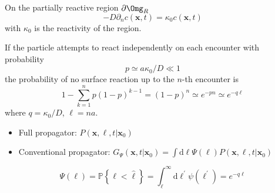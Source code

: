 \documentclass[9pt]{beamer}
\newcommand{\mrm}{\mathrm}
\newcommand{\llc}{\left\{}
\newcommand{\rrc}{\right\}}
\newcommand{\kpa}{\kappa}
\begin{document}
\begin{frame}[noframenumbering]

\large

On the partially reactive region $\partial \Omg_R$
$$ -D \partial_n c(\mathbf{x},t) = \kpa_0 c(\mathbf{x},t) $$
with $\kpa_0$ is the reactivity of the region.



If the particle attempts to react independently on each encounter with probability 
$$ p \simeq a \kpa_0 / D \ll 1 $$
the probability of no surface reaction up to the $n$-th encounter is 
$$ 1 - \sum_{k=1}^n p(1-p)^{k-1} = (1-p)^n \simeq e^{-p n} \simeq e^{-q \ell} $$
where $q = \kpa_0/D$, $\ell = n a$.

\bigskip

\begin{itemize}
  \item Full propagator: $P(\mathbf{x},\ell,t|\mathbf{x}_0) $
  \item Conventional propagator: $G_\Psi(\mathbf{x},t|\mathbf{x}_0) = \int \mrm{d} \ell \Psi(\ell) P(\mathbf{x},\ell,t|\mathbf{x}_0) $
\end{itemize}


$$ \Psi(\ell) = \mathbb{P} \llc \ell < \hat{\ell} \rrc = \int_\ell^\infty \mrm{d} \ell^\prime \psi(\ell^\prime) = e^{-q \ell} $$




\end{frame}
\end{document}
